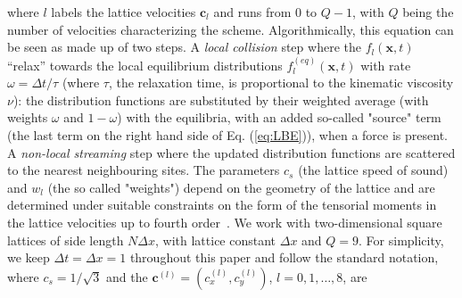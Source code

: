 where $l$ labels the lattice velocities $\mathbf{c}_l$ and runs from $0$ to $Q-1$, with $Q$ being the number of velocities characterizing the scheme.
Algorithmically, this equation can be seen as made up of two steps. 
A \textit{local collision} step where the $f_l(\mathbf{x},t)$ ``relax'' towards the local equilibrium distributions $f^{(eq)}_l(\mathbf{x},t)$ with rate $\omega = \Delta t/\tau$ (where $\tau$, the relaxation time, is proportional to the kinematic viscosity $\nu$): the distribution functions are substituted by their weighted average (with weights $\omega$ and $1-\omega$) with the equilibria, with an added so-called "source" term (the last term on the right hand side of Eq. (\ref{eq:LBE})), when a force is present. 
A \textit{non-local streaming} step where the updated distribution functions are scattered to the nearest neighbouring sites. 
The parameters $c_s$ (the lattice speed of sound) and $w_l$ (the so called "weights") depend on the geometry of the lattice and are determined under suitable constraints on the form of the tensorial moments in the lattice velocities up to fourth order~\cite{wolf-gladrowLatticeGasCellularAutomata2004}.
We work with two-dimensional square lattices of side length $N\Delta x$, with lattice constant $\Delta x$ and $Q=9$.
For simplicity, we keep $\Delta t=\Delta x=1$ throughout this paper and follow the standard notation, where $c_s = 1/\sqrt{3}$ and the $\mathbf{c}^{(l)} = (c^{(l)}_x,c^{(l)}_y)$, $l=0,1,\dots,8$, are~\cite{qianFractionalPropagationElimination1997,shanLatticeBoltzmannModel1993} 

